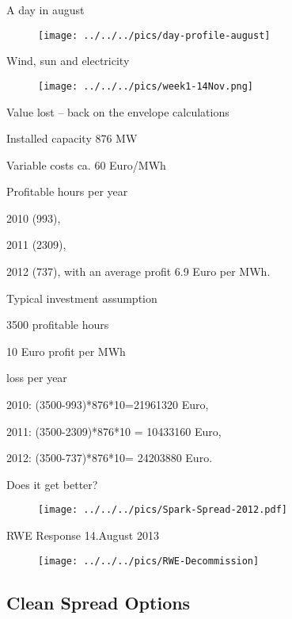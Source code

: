 {A day in august}
\begin{figure}[htp]
\centering
\texttt{[image: ../../../pics/day-profile-august]}
\end{figure}

{Wind, sun and electricity}
\begin{figure}[htp]
\centering
\texttt{[image: ../../../pics/week1-14Nov.png]}
\end{figure}

{Value lost -- back on the envelope calculations}
\item<1-> Installed capacity 876 MW
\item<2-> Variable costs ca. 60 Euro/MWh
\item<3-> Profitable hours per year
\item  2010 (993),
\item 2011 (2309),
\item 2012 (737),
with an average profit 6.9 Euro per MWh.
\item<4-> Typical investment assumption
\item 3500 profitable hours
\item 10 Euro profit per MWh
\item<5-> loss per year
\item  2010: (3500-993)*876*10=21961320 Euro,
\item 2011:  (3500-2309)*876*10 = 10433160 Euro,
\item 2012: (3500-737)*876*10= 24203880 Euro.



{Does it get better?}
\begin{figure}[htp]
\centering
\texttt{[image: ../../../pics/Spark-Spread-2012.pdf]}
\end{figure}

{RWE Response 14.August 2013}
\begin{figure}[htp]
\centering
\texttt{[image: ../../../pics/RWE-Decommission]}
\end{figure}

\subsection{Clean Spread Options}

